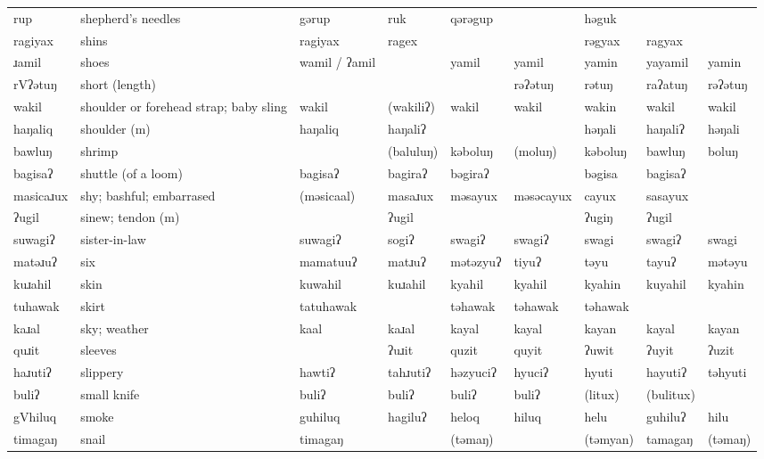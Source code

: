 \begin{landscape}
\begin{longtable}{*{9}{>{\raggedright\arraybackslash}p{}}}
\text{*}rup         & shepherd's needles & gərup & ruk & qərəgup &  & həguk &  & \\
\text{*}ragiyax      & shins & ragiyax & ragex &  &  & rəgyax & ragyax & \\
\text{*}ɹamil        & shoes & wamil / ʔamil &  & yamil & yamil & yamin & yayamil & yamin\\
\text{*}rVʔətuŋ      & short (length) &  &  &  & rəʔətuŋ & rətuŋ & raʔatuŋ & rəʔətuŋ\\
\text{*}wakil        & shoulder or forehead strap; baby sling & wakil & (wakiliʔ) & wakil & wakil & wakin & wakil & wakil\\
\text{*}haŋaliq      & shoulder (m) & haŋaliq & haŋaliʔ &  &  & həŋali & haŋaliʔ & həŋali\\
\text{*}bawluŋ       & shrimp &  & (baluluŋ) & kəboluŋ & (moluŋ) & kəboluŋ & bawluŋ & boluŋ\\
\text{*}bagisaʔ      & shuttle (of a loom) & bagisaʔ & bagiraʔ & bəgiraʔ &  & bəgisa & bagisaʔ & \\
\text{*}masicaɹux    & shy; bashful; embarrased & (məsicaal) & masaɹux & məsayux & məsəcayux & cayux & sasayux & \\
\text{*}ʔugil        & sinew; tendon (m) &  & ʔugil &  &  & ʔugiŋ & ʔugil & \\
\text{*}suwagiʔ      & sister-in-law & suwagiʔ & sogiʔ & swagiʔ & swagiʔ & swagi & swagiʔ & swagi\\
\text{*}matəɹuʔ      & six & mamatuuʔ & matɹuʔ & mətəzyuʔ & tiyuʔ & təyu & tayuʔ & mətəyu\\
\text{*}kuɹahil      & skin & kuwahil & kuɹahil & kyahil & kyahil & kyahin & kuyahil & kyahin\\
\text{*}tuhawak      & skirt & tatuhawak &  & təhawak & təhawak & təhawak &  & \\
\text{*}kaɹal        & sky; weather & kaal & kaɹal & kayal & kayal & kayan & kayal & kayan\\
\text{*}quɹit        & sleeves &  & ʔuɹit & quzit & quyit & ʔuwit & ʔuyit & ʔuzit\\
\text{*}haɹutiʔ      & slippery & hawtiʔ & tahɹutiʔ & həzyuciʔ & hyuciʔ & hyuti & hayutiʔ & təhyuti\\
\text{*}buliʔ        & small knife & buliʔ & buliʔ & buliʔ & buliʔ & (litux) & (bulitux) & \\
\text{*}gVhiluq      & smoke & guhiluq & hagiluʔ & heloq & hiluq & helu & guhiluʔ & hilu\\
\text{*}timagaŋ      & snail & timagaŋ &  & (təmaŋ) &  & (təmyan) & tamagaŋ & (təmaŋ)\\

\end{longtable}
\end{landscape}
